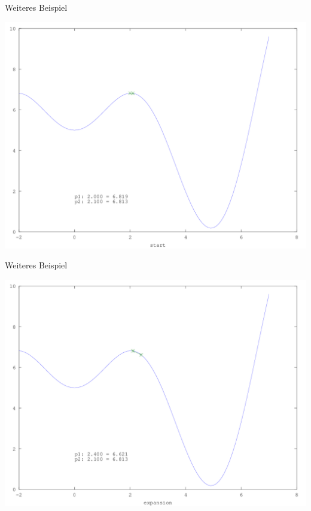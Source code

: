 \documentclass[\outputformat]{beamer}
\begin{document}
\begin{frame}{Weiteres Beispiel}
	\begin{center}
		\includegraphics[height=0.75\paperheight]{../bilder/GlobMinima/sinx_x001.png}
	\end{center}
\end{frame}
\begin{frame}{Weiteres Beispiel}
	\begin{center}
		\includegraphics[height=0.75\paperheight]{../bilder/GlobMinima/sinx_x002.png}
	\end{center}
\end{frame}
\end{document}
